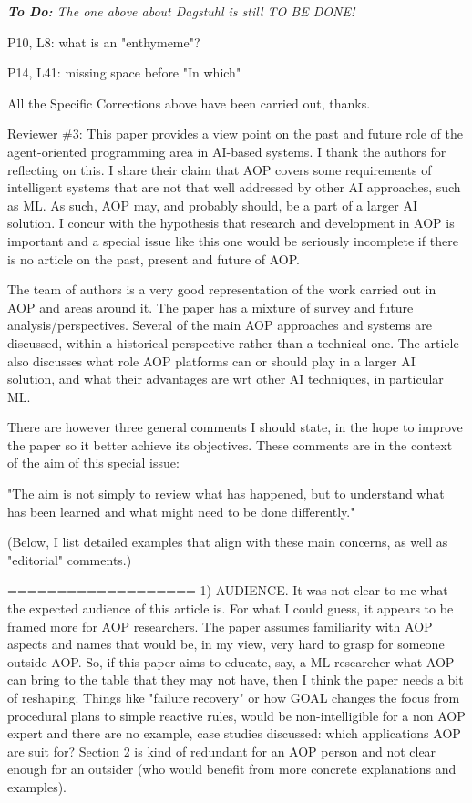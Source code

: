 \documentclass[12pt]{article}
\newenvironment{reviews}{\bigskip\itshape}{\upshape\bigskip}
\newenvironment{response}{\bigskip\normalfont}{\bigskip}
\newcommand{\tbd}[1]{\textsf{\textbf{To Do:} #1}}
\begin{document}
\begin{reviews}
\tbd{The one above about Dagstuhl is still TO BE DONE!}

P10, L8: what is an "enthymeme"?

P14, L41: missing space before "In which"

\begin{response}
All the Specific Corrections above have been carried out, thanks.
\end{response}

Reviewer \#3: This paper provides a view point on the past and future role of the agent-oriented programming area in AI-based systems. I thank the authors for reflecting on this. I share their claim that AOP covers some requirements of intelligent systems that are not that well addressed by other AI approaches, such as ML. As such, AOP may, and probably should, be a part of a larger AI solution. I concur with the hypothesis that research and development in AOP is important and a special issue like this one would be seriously incomplete if there is no article on the past, present and future of AOP.

The team of authors is a very good representation of the work carried out in AOP and areas around it. The paper has a mixture of survey and future analysis/perspectives. Several of the main AOP approaches and systems are discussed, within a historical perspective rather than a technical one. The article also discusses what role AOP platforms can or should play in a larger AI solution, and what their advantages are wrt other AI techniques, in particular ML.

There are however three general comments I should state, in the hope to improve the paper so it better achieve its objectives. These comments are in the context of the aim of this special issue:

"The aim is not simply to review what has happened, but to understand what has been learned and what might need to be
done differently."

(Below, I list detailed examples that align with these main concerns, as well as "editorial" comments.) 

===================
1) AUDIENCE. It was not clear to me what the expected audience of this article is. For what I could guess, it appears to be framed more for AOP researchers. The paper assumes familiarity with AOP aspects and names that would be, in my view, very hard to grasp for someone outside AOP. So, if this paper aims to educate, say, a ML researcher what AOP can bring to the table that they may not have,  then I think the paper needs a bit of reshaping. Things like "failure recovery" or how GOAL changes the focus from procedural plans to simple reactive rules, would be non-intelligible for a non AOP expert and there are no example, case studies discussed: which applications AOP are suit for? Section 2 is kind of redundant for an AOP person and not clear enough for an outsider (who would benefit from more concrete explanations and examples). 



\end{reviews}
\end{document}
